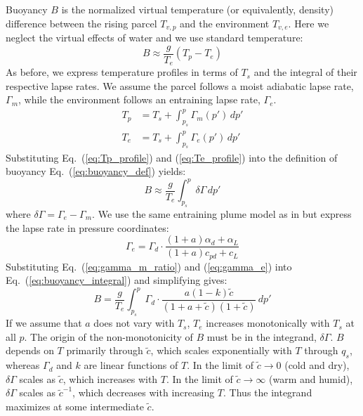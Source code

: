 \documentclass[draft]{ametsocV6.1}
\begin{document}
Buoyancy $B$ is the normalized virtual temperature (or equivalently, density) difference between the rising parcel $T_{v,p}$ and the environment $T_{v,e}$. Here we neglect the virtual effects of water and we use standard temperature:
\begin{equation}
B\approx\frac{g}{T_e}(T_p-T_e) \label{eq:buoyancy_def}
\end{equation}
As before, we express temperature profiles in terms of $T_s$ and the integral of their respective lapse rates. We assume the parcel follows a moist adiabatic lapse rate, $\Gamma_m$, while the environment follows an entraining lapse rate, $\Gamma_e$.
\begin{align}
T_p&=T_s+\int_{p_s}^p \Gamma_m(p') \, dp' \label{eq:Tp_profile} \\
T_e&=T_s+\int_{p_s}^p \Gamma_e(p') \, dp' \label{eq:Te_profile}
\end{align}
Substituting Eq.~(\ref{eq:Tp_profile}) and (\ref{eq:Te_profile}) into the definition of buoyancy Eq.~(\ref{eq:buoyancy_def}) yields:
\begin{equation}
B\approx\frac{g}{T_e}\int_{p_s}^p \delta \Gamma \, dp' \label{eq:buoyancy_integral}
\end{equation}
where $\delta\Gamma = \Gamma_e - \Gamma_m$. We use the same entraining plume model as in \cite{romps2016} but express the lapse rate in pressure coordinates:
\begin{equation}
\Gamma_e = \Gamma_d \cdot \frac{(1+a)\alpha_d + \alpha_L}{(1+a)c_{pd}+c_L} \label{eq:gamma_e}
\end{equation}
Substituting Eq.~(\ref{eq:gamma_m_ratio}) and (\ref{eq:gamma_e}) into Eq.~(\ref{eq:buoyancy_integral}) and simplifying gives:
\begin{equation}
    B = \frac{g}{T_e}\int_{p_s}^p \Gamma_d \cdot \frac{a(1-k)\tilde{c}}{(1+a+\tilde{c})(1+\tilde{c})} \, dp' \label{eq:buoyancy_final}
\end{equation}
If we assume that $a$ does not vary with $T_s$, $T_e$ increases monotonically with $T_s$ at all $p$. The origin of the non-monotonicity of $B$ must be in the integrand, $\delta \Gamma$. $B$ depends on $T$ primarily through $\tilde{c}$, which scales exponentially with $T$ through $q_s$, whereas $\Gamma_d$ and $k$ are linear functions of $T$. In the limit of $\tilde{c} \to 0$ (cold and dry), $\delta\Gamma$ scales as $\tilde{c}$, which increases with $T$. In the limit of $\tilde{c} \to \infty$ (warm and humid), $\delta\Gamma$ scales as $\tilde{c}^{-1}$, which decreases with increasing $T$. Thus the integrand maximizes at some intermediate $\tilde{c}$.
\end{document}
